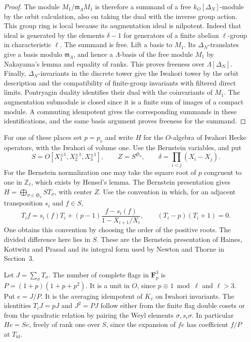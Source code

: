 \documentclass[a4paper,11pt]{article}
\theoremstyle{definition}
\theoremstyle{remark}
\newcommand{\ZZ}{\mathbb Z}\newcommand{\ord}{\operatorname{ord}}
\numberwithin{equation}{section}
\begin{document}
\begin{proof}
The module \(M_1/\mathfrak m_\Lambda M_1\) is therefore a
summand of a free \(k_O[\Delta_N]\)-module by the orbit
calculation, also on taking the dual with the inverse group
action. This group ring is local because its augmentation ideal
is nilpotent. Indeed that ideal is generated by the elements \(\delta-1\)
for generators of a finite abelian \(\ell\)-group in
characteristic \(\ell\). The summand is free. Lift a basis
to \(M_1\). Its \(\Delta_N\)-translates give a basis modulo
\(\mathfrak m_\Lambda\), and hence a \(\Lambda\)-basis of
the free module \(M_1\) by Nakayama's lemma and equality of
ranks. This proves freeness over \(\Lambda[\Delta_N]\).
Finally, \(\Delta_N\)-invariants in the discrete tower give
the Iwahori tower by the orbit description and the compatibility
of finite-group invariants with filtered direct limits.
Pontryagin duality identifies their dual with the
coinvariants of \(M_1\). The augmentation submodule is
closed since it is a finite sum of images of a compact
module. A commuting idempotent gives the corresponding
summands in these identifications, and the same basis
argument proves freeness for the summand.
\end{proof}

For one of these places set \(p=p_v\) and write \(H\) for
the \(O\)-algebra of Iwahori Hecke operators, with the
Iwahori of volume one. Use the Bernstein variables, and put
\[
 S=O[X_1^{\pm1},X_2^{\pm1},X_3^{\pm1}],\qquad
 Z=S^{\mathfrak S_3},\qquad
 \delta=\prod_{i<j}(X_i-X_j).
\]
For the Bernstein normalization one may take the square root
of \(p\) congruent to one in \(\ZZ_\ell\), which exists by
Hensel's lemma. The Bernstein presentation gives
\(H=\bigoplus_{\sigma\in\mathfrak S_3}S T_\sigma\), with center
\(Z\). Use the convention in which, for an adjacent transposition
\(s_i\) and \(f\in S\),
\[
 T_i f=s_i(f)T_i+(p-1)\frac{f-s_i(f)}{1-X_{i+1}/X_i},
 \qquad (T_i-p)(T_i+1)=0 .
\]
One obtains this convention by choosing the order of the
positive roots. The divided difference here lies in \(S\).
These are the Bernstein presentation of Haines, Kottwitz
and Prasad and its integral form used by Newton and Thorne
in Section~3.~\cite{VII-V-hkp370,VII-V-VI-nt119}

Let \(J=\sum_\sigma T_\sigma\). The number of complete flags
in \(\mathbf F_p^3\) is \(P=(1+p)(1+p+p^2)\). It is a unit
in \(O\), since \(p\equiv1\bmod\ell\) and \(\ell>3\).
Put \(e=J/P\). It is the averaging idempotent of \(K_v\) on
Iwahori invariants. The identities \(T_i J=pJ\) and
\(J^2=PJ\) follow either from the finite flag double cosets
or from the quadratic relation by pairing the Weyl elements
\(\sigma,s_i\sigma\). In particular \(He=Se\), freely of rank
one over \(S\), since the expansion of \(fe\) has coefficient
\(f/P\) at \(T_{\mathrm{id}}\).
\end{document}
